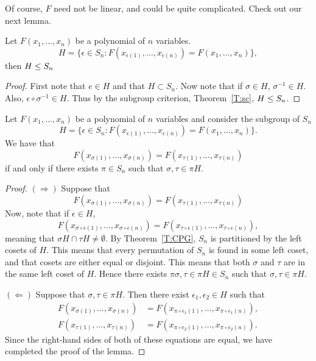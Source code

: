 \documentclass{ximera}
\begin{document}
Of course, $F$ need not be linear, and could be quite
complicated. Check out our next lemma.



\begin{lemma}
  Let $F(x_1,\dots,x_n)$ be a polynomial of $n$ variables.
  \[
  H = \{\epsilon\in S_n: F(x_{\epsilon(1)},\dots, x_{\epsilon(n)}) = F(x_1,\dots,x_n)\},
  \]
  then $H\leq S_n$
  \begin{proof}
    First note that $e\in H$ and that $H\subset S_n$. Now note that if
    $\sigma\in H$, $\sigma^{-1}\in H$. Also, $\epsilon\circ \sigma^{-1}\in
    H$. Thus by the subgroup criterion, Theorem~\ref{T:sc}, $H\leq
    S_n$.
  \end{proof}
\end{lemma}


\begin{lemma}\label{L:cap}
  Let $F(x_1,\dots,x_n)$ be a polynomial of $n$ variables and consider
  the subgroup of $S_n$
  \[
  H = \{\epsilon\in S_n: F(x_{\epsilon(1)},\dots, x_{\epsilon(n)}) = F(x_1,\dots,x_n)\}.
  \]
  We have that 
  \[
  F(x_{\sigma(1)},\dots, x_{\sigma(n)}) = F(x_{\tau(1)},\dots, x_{\tau(n)})
  \]
  if and only if there exists $\pi \in S_n$ such that $\sigma,\tau\in\pi H$.
  \begin{proof}
    $(\Rightarrow)$ Suppose that
    \[
    F(x_{\sigma(1)},\dots, x_{\sigma(n)}) = F(x_{\tau(1)},\dots, x_{\tau(n)})
    \]
    Now, note that if $\epsilon \in H$,
    \[
    F(x_{\sigma\circ\epsilon(1)},\dots, x_{\sigma\circ\epsilon(n)}) =
    F(x_{\tau\circ\epsilon(1)},\dots,
    x_{\tau\circ\epsilon(n)}),
    \]
    meaning that $\sigma H \cap \tau H \ne \emptyset$. By
    Theorem~\ref{T:CPG}, $S_n$ is partitioned by the left cosets of
    $H$. This means that every permutation of $S_n$ is found in some
    left coset, and that cosets are either equal or disjoint. This
    means that both $\sigma$ and $\tau$ are in the same left coset of
    $H$. Hence there exists $\pi \sigma,\tau\in\pi H\in S_n$ such that
    $\sigma,\tau\in\pi H$.

    $(\Leftarrow)$ Suppose that $\sigma,\tau\in \pi H$. Then
    there exist $\epsilon_1,\epsilon_2\in H$ such that
    \begin{align*}
      F(x_{\sigma(1)},\dots, x_{\sigma(n)}) &=
    F(x_{\pi\circ\epsilon_1(1)},\dots,
    x_{\pi\circ\epsilon_1(n)}), \\
      F(x_{\tau(1)},\dots, x_{\tau(n)}) &=
    F(x_{\pi\circ\epsilon_2(1)},\dots,
    x_{\pi\circ\epsilon_2(n)}).
    \end{align*}
    Since the right-hand sides of both of these equations are equal,
    we have completed the proof of the lemma.
  \end{proof}
\end{lemma}
\end{document}
